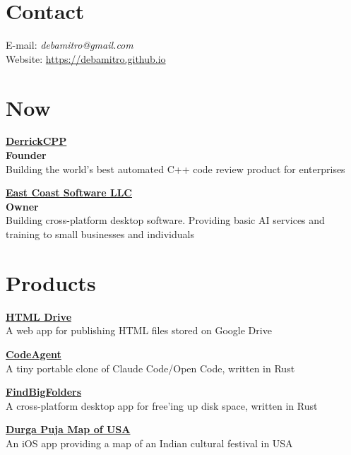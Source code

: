 \documentclass[margin,line]{res}
\begin{document}

\begin{resume}


\section{\sc Contact}
E-mail: {\em debamitro@gmail.com} \\
Website: \href{https://debamitro.github.io/}{https://debamitro.github.io}

\section{\sc Now}
{\bf \href{https://www.derrickcpp.com}{DerrickCPP}} \\
{\bf Founder} \\
Building the world's best automated C++ code review product for enterprises


{\bf \href{https://www.eastcoastsoft.com}{East Coast Software LLC}} \\
{\bf Owner} \\
Building cross-platform desktop software. Providing basic AI services and training to small businesses and individuals


\section{\sc Products}
{\bf \href{https://www.html-drive.com}{HTML Drive}} \\
A web app for publishing HTML files stored on Google Drive

{\bf \href{https://github.com/debamitro/one-shot-cli-agent}{CodeAgent}} \\
A tiny portable clone of Claude Code/Open Code, written in Rust

{\bf \href{https://www.eastcoastsoft.com/products/findbigfolders}{FindBigFolders}} \\
A cross-platform desktop app for free'ing up disk space, written in Rust

{\bf \href{https://apps.apple.com/us/app/durga-puja-map-of-usa/id6752311800}{Durga Puja Map of USA}} \\
An iOS app providing a map of an Indian cultural festival in USA


\end{resume}
\end{document}
